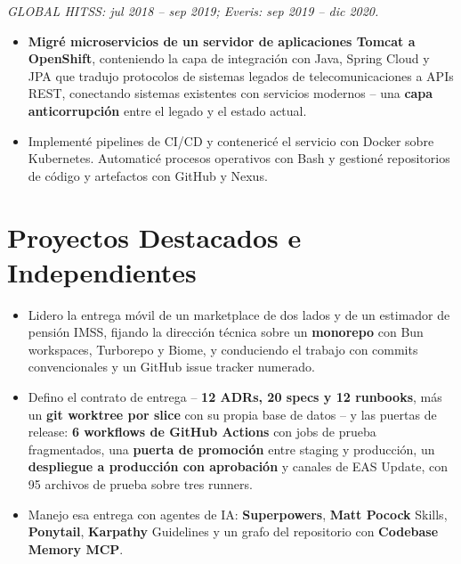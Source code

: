 {
\textit{GLOBAL HITSS: jul 2018 -- sep 2019; Everis: sep 2019 -- dic 2020.}\par\vspace{3pt}
\begin{itemize}
    \item \textbf{Migré microservicios de un servidor de aplicaciones Tomcat a OpenShift}, conteniendo la capa de integración con Java, Spring Cloud y JPA que tradujo protocolos de sistemas legados de telecomunicaciones a APIs REST, conectando sistemas existentes con servicios modernos -- una \textbf{capa anticorrupción} entre el legado y el estado actual.
    \item Implementé pipelines de CI/CD y contenericé el servicio con Docker sobre Kubernetes. Automaticé procesos operativos con Bash y gestioné repositorios de código y artefactos con GitHub y Nexus.
\end{itemize}

\section*{Proyectos Destacados e Independientes}

\begin{itemize}
    \item Lidero la entrega móvil de un marketplace de dos lados y de un estimador de pensión IMSS, fijando la dirección técnica sobre un \textbf{monorepo} con Bun workspaces, Turborepo y Biome, y conduciendo el trabajo con commits convencionales y un GitHub issue tracker numerado.
    \item Defino el contrato de entrega -- \textbf{12 ADRs, 20 specs y 12 runbooks}, más un \textbf{git worktree por slice} con su propia base de datos -- y las puertas de release: \textbf{6 workflows de GitHub Actions} con jobs de prueba fragmentados, una \textbf{puerta de promoción} entre staging y producción, un \textbf{despliegue a producción con aprobación} y canales de EAS Update, con 95 archivos de prueba sobre tres runners.
    \item Manejo esa entrega con agentes de IA: \textbf{Superpowers}, \textbf{Matt Pocock} Skills, \textbf{Ponytail}, \textbf{Karpathy} Guidelines y un grafo del repositorio con \textbf{Codebase Memory MCP}.
\end{itemize}

}
